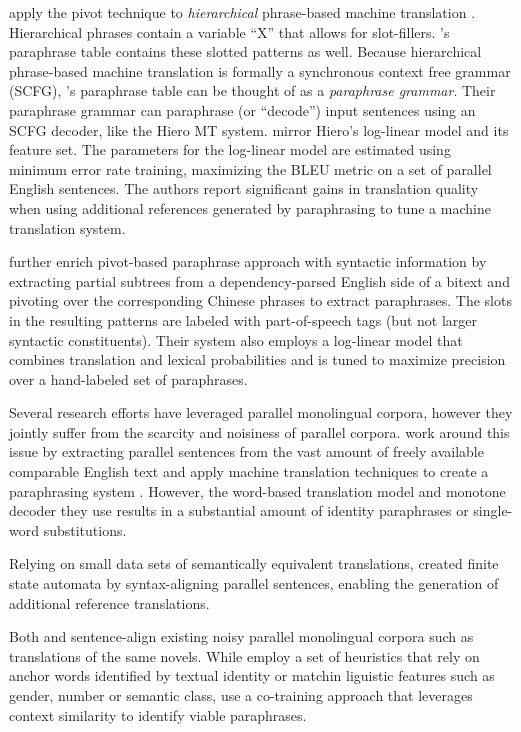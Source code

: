 \documentclass[11pt]{article}
\newcommand{\mnote}[1]{\marginpar{%
  \vskip-\baselineskip
  \raggedright\footnotesize
  \itshape\hrule\smallskip\footnotesize{#1}\par\smallskip\hrule}}
\begin{document}
 apply the pivot technique to {\it hierarchical}
phrase-based machine translation \cite{Chiang2005}. Hierarchical
phrases contain a variable ``X'' that allows for slot-fillers.
's paraphrase table contains these slotted
patterns as well. Because hierarchical phrase-based machine
translation is formally a synchronous context free grammar (SCFG),
's paraphrase table can be thought of as a {\it
  paraphrase grammar}. Their paraphrase grammar can paraphrase (or
``decode'') input sentences using an SCFG decoder, like the Hiero MT
system.  mirror Hiero's log-linear model and its
feature set. The parameters for the log-linear model are estimated
using minimum error rate training, maximizing the BLEU metric on a set
of parallel English sentences. The authors report significant gains in
translation quality when using additional references generated by
paraphrasing to tune a machine translation system.

 further enrich pivot-based paraphrase approach with
syntactic information by extracting partial subtrees from a
dependency-parsed English side of a bitext and pivoting over the
corresponding Chinese phrases to extract paraphrases. The slots in the
resulting patterns are labeled with part-of-speech tags (but not
larger syntactic constituents). Their system also employs a log-linear
model that combines translation and lexical probabilities and is tuned
to maximize precision over a hand-labeled set of paraphrases.

Several research efforts have leveraged parallel monolingual corpora,
however they jointly suffer from the scarcity and noisiness of
parallel corpora. \mnote{Ah, yes. That's some excellent English right
  there.}  work around this issue by extracting
parallel sentences from the vast amount of freely available comparable
English text and apply machine translation techniques to create a
paraphrasing system \cite{Quirk2004}. However, the word-based
translation model and monotone decoder they use results in a
substantial amount of identity paraphrases or single-word
substitutions.

Relying on small data sets of semantically equivalent translations,
 created finite state automata by syntax-aligning
parallel sentences, enabling the generation of additional reference
translations.

Both  and  sentence-align
existing noisy parallel monolingual corpora such as translations of
the same novels. While  employ a set of
heuristics that rely on anchor words identified by textual identity or
matchin liguistic features such as gender, number or semantic class,
 use a co-training approach that leverages
context similarity to identify viable paraphrases.
\end{document}
